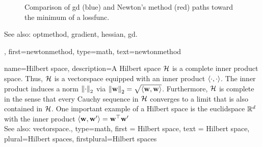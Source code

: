 {{\begin{figure}[H]
		\caption{Comparison of \gls{gd} (blue) and Newton's method (red) paths toward the \gls{minimum} of a 
			\gls{lossfunc}. \label{fig_newtonmethod_dict}}
		\end{figure}
		See also: \gls{optmethod}, \gls{gradient}, \gls{hessian}, \gls{gd}. },
  	first={newtonmethod},
 	type=math,
  	text={newtonmethod} 
}

{name={Hilbert space},
 description={A  Hilbert space $\mathcal{H}$ is a complete 
    inner product space. Thus, $\mathcal{H}$ is a \gls{vectorspace} 
	equipped with an inner product $\langle \cdot, \cdot \rangle$. The inner product 
	induces a norm $\left\Vert {\cdot} \right\Vert_{2}$ via $\left\Vert {{\bf w}} \right\Vert_{2} = \sqrt{\langle {\bf w}, {\bf w} \rangle}$. 
  	Furthermore, $\mathcal{H}$ is complete in the sense that every 
 	Cauchy sequence in $\mathcal{H}$ converges to a limit that is also 
 	contained in $\mathcal{H}$. One important example of a Hilbert space 
 	is the \gls{euclidspace} $\mathbb{R}^{d}$ with the 
 	inner product $\langle {\bf w}, {\bf w}' \rangle = {\bf w}^{\top} {\bf w}'$ \\
   	See also: \gls{vectorspace}.},
   	type=math, 
 	first = {Hilbert space}, 
    text = {Hilbert space},
   	plural={Hilbert spaces},
   	firstplural={Hilbert spaces}
  }


